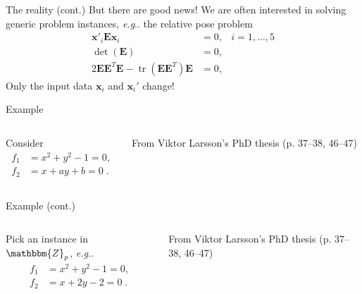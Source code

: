 \documentclass[aspectratio=169]{beamer}
\makeatletter
\newcommand{\mat}[1]{\bm{#1}}
\newcommand{\Z}{\ensuremath{\mathbbm{Z}}}
\DeclareMathOperator{\tr}{tr}
\newcommand{\T}{T}
\DeclareRobustCommand\eg{\emph{e.g}\@ifnextchar.{}{.\@}}
\makeatother
\begin{document}
\begin{frame}{The reality (cont.)}
But there are good news!
We are often interested in solving generic problem instances, \eg{} the relative pose
problem
\begin{equation*}
\begin{aligned}
    \mat{x}'_i\mat{E}\mat{x}_i &= 0, &i=1,\ldots,5\\
    \det(\mat{E}) &= 0, &\\
    2\mat{EE}^\T\mat{E}- \tr(\mat{EE}^\T)\mat{E} &= 0, &
\end{aligned}
\end{equation*}
Only the input data $\mat{x}_i$ and $\mat{x}_i'$ change!
\end{frame}

\begin{frame}[t]{Example}
\vspace{1cm}
\begin{columns}
    \begin{column}{0.7\textwidth}
        Consider
        \begin{equation*}
        \begin{aligned}
            f_1 &= x^2+y^2-1=0, \\
            f_2 &= x + ay + b =0\;.
        \end{aligned}
        \end{equation*}
    \end{column}%
    \begin{column}{0.3\textwidth}
        \centering
        

        \vspace{5mm}

        {\scriptsize From Viktor Larsson's PhD thesis (p. 37--38, 46--47)}
    \end{column}
\end{columns}
\end{frame}

\begin{frame}[t]{Example (cont.)}
\vspace{1cm}
\begin{columns}
    \begin{column}{0.7\textwidth}
        Pick an instance in $\Z_p$, \eg{}
        \begin{equation*}
        \begin{aligned}
            f_1 &= x^2+y^2-1=0, \\
            f_2 &= x + 2y - 2 =0\;.
        \end{aligned}
        \end{equation*}
    \end{column}%
    \begin{column}{0.3\textwidth}
        \centering
        

        \vspace{5mm}

        {\scriptsize From Viktor Larsson's PhD thesis (p. 37--38, 46--47)}
    \end{column}
\end{columns}
\end{frame}
\end{document}
